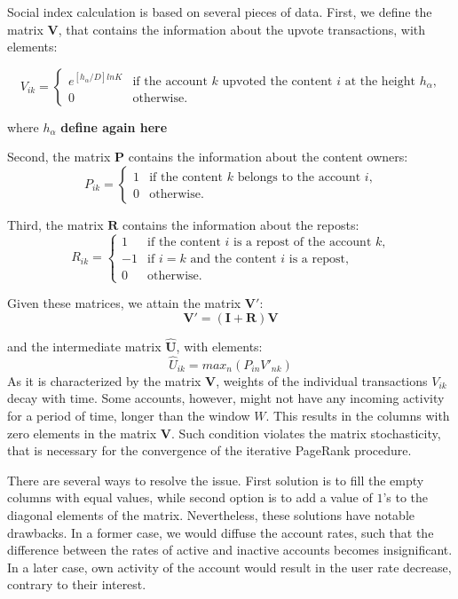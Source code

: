 \documentclass[a4paper,12pt]{article}
\begin{document}
Social index calculation is based on several pieces of data. First, we define the matrix $\boldsymbol{V}$, that contains the information about the upvote transactions, with elements:
	
	$$	
	V_{ik} = \begin{cases}
	 e^{[h_\alpha/D]ln K}
	 & \text{if the account $k$ upvoted the content $i$ at the height $h_\alpha$,}\\
	 0 & \text{otherwise.}
	\end{cases}
	$$
	
	where $h_\alpha$ \textbf{define again here}
	
	Second, the matrix $\boldsymbol{P}$ contains the information about the content owners:
	$$
	P_{ik} = \begin{cases}
	 1
	 & \text{if the content $k$ belongs to the account $i$,}\\
	 0 & \text{otherwise.}
	\end{cases}
	$$
	
	Third, the matrix $\boldsymbol{R}$ contains the information about the reposts:
	$$
	R_{ik} = \begin{cases}
	 1 & \text{if the content $i$ is a repost of the account $k$,}\\
	 -1 & \text{if $i=k$ and the content $i$ is a repost,}\\
	 0 & \text{otherwise.}
	\end{cases}
	$$
	
	Given these matrices, we attain the matrix $\boldsymbol{V'}$:
	$$
\boldsymbol{V'} = ( \boldsymbol{I} + \boldsymbol{R} ) \boldsymbol{V}
$$
	
	and the intermediate matrix $\boldsymbol{\hat{U}}$, with elements:
	$$
	\hat{U}_{ik} = max_n(P_{in} V'_{nk})
	$$
	As it is characterized by the matrix $\boldsymbol{V}$, weights of the individual transactions $V_{ik}$ decay with time. Some accounts, however, might not have any incoming activity for a period of time, longer than the window $W$. This results in the columns with zero elements in the matrix $\boldsymbol{V}$. Such condition violates the matrix stochasticity, that is necessary for the convergence of the iterative PageRank procedure. 
	
	There are several ways to resolve the issue. First solution is to fill the empty columns with equal values, while second option is to add a value of $1$'s to the diagonal elements of the matrix. Nevertheless, these solutions have notable drawbacks. In a former case, we would diffuse the account rates, such that the difference between the rates of active and inactive accounts becomes insignificant. In a later case, own activity of the account would result in the user rate decrease, contrary to their interest.
	
\end{document}
